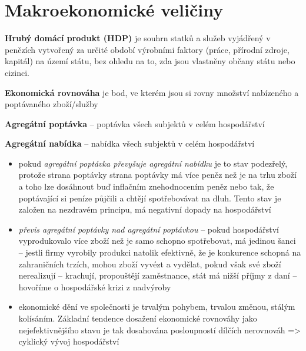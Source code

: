 \chapter{Makroekonomické veličiny}

\textbf{Hrubý domácí produkt (HDP)} je souhrn statků a služeb vyjádřený v penězích vytvořený za určité období výrobními faktory (práce, přírodní zdroje, kapitál) na území státu, bez ohledu na to, zda jsou vlastněny občany státu nebo cizinci.

\textbf{Ekonomická rovnováha} je bod, ve kterém jsou si rovny množství nabízeného a poptávaného zboží/služby

\textbf{Agregátní poptávka} -- poptávka všech subjektů v celém hospodářství

\textbf{Agregátní nabídka} -- nabídka všech subjektů v celém hospodářství
\begin{itemize}
    \item pokud \textit{agregátní poptávka převyšuje agregátní nabídku} je to stav podezřelý, protože strana poptávky strana poptávky má více peněz než je na trhu zboží a toho lze dosáhnout buď inflačním znehodnocením peněz nebo tak, že poptávající si peníze půjčili a chtějí spotřebovávat na dluh. Tento stav je založen na nezdravém principu, má negativní dopady na hospodářství
    \item \textit{převis agregátní poptávky nad agregátní poptávkou} -- pokud hospodářství vyprodukovalo více zboží než je samo schopno spotřebovat, má jedinou šanci -- jestli firmy vyrobily produkci natolik efektivně, že je konkurence schopná na zahraničních trzích, mohou zboží vyvézt a vydělat, pokud však své zboží nerealizují -- krachují, propouštějí zaměstnance, stát má nižší příjmy z daní -- hovoříme o hospodářské krizi z nadvýroby
    \item ekonomické dění ve společnosti je trvalým pohybem, trvalou změnou, stálým kolísáním. Základní tendence dosažení ekonomické rovnováhy jako nejefektivnějšího stavu je tak dosahována posloupností dílčích nerovnováh => cyklický vývoj hospodářství
\end{itemize}

